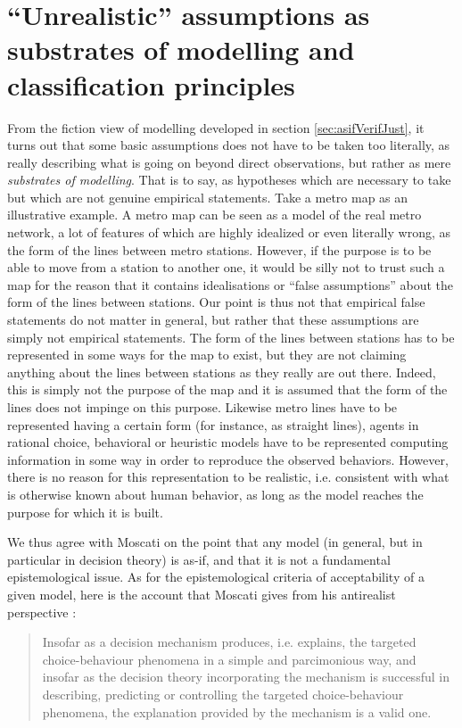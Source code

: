 \documentclass[a4paper,11pt]{article}
\theoremstyle{definition}
\begin{document}
\section{``Unrealistic'' assumptions as substrates of modelling and classification principles}
\label{sec:epistemo_criterion}

From the fiction view of modelling developed in section \ref{sec:asifVerifJust}, it turns out that some basic assumptions does not have to be taken too literally, as really describing what is going on beyond direct observations, but rather as mere \textit{substrates of modelling}. That is to say, as hypotheses which are necessary to take but which are not genuine empirical statements. Take a metro map as an illustrative example. A metro map can be seen as a model of the real metro network, a lot of features of which are highly idealized or even literally wrong, as the form of the lines between metro stations. However, if the purpose is to be able to move from a station to another one, it would be silly not to trust such a map for the reason that it contains idealisations or ``false assumptions'' about the form of the lines between stations. Our point is thus not that empirical false statements do not matter in general, but rather that these assumptions are simply not empirical statements. The form of the lines between stations has to be represented in some ways for the map to exist, but they are not claiming anything about the lines between stations as they really are out there. Indeed, this is simply not the purpose of the map and it is assumed that the form of the lines does not impinge on this purpose. Likewise metro lines have to be represented having a certain form (for instance, as straight lines), agents in rational choice, behavioral or heuristic models have to be represented computing information in some way in order to reproduce the observed behaviors. However, there is no reason for this representation to be realistic, i.e. consistent with what is otherwise known about human behavior, as long as the model reaches the purpose for which it is built. 

We thus agree with Moscati on the point that any model (in general, but in particular in decision theory) is as-if, and that it is not a fundamental epistemological issue. As for the epistemological criteria of acceptability of a given model, here is the account that Moscati gives from his antirealist perspective \citep[p.~22]{Moscati2023}: 

\begin{quote}
Insofar as a decision mechanism produces, i.e. explains, the targeted choice-behaviour phenomena in a simple and parcimonious way, and insofar as the decision theory incorporating the mechanism is successful \textelp{} in describing, predicting or controlling the targeted choice-behaviour phenomena, the explanation provided by the mechanism is a valid one.
\end{quote}
\end{document}
